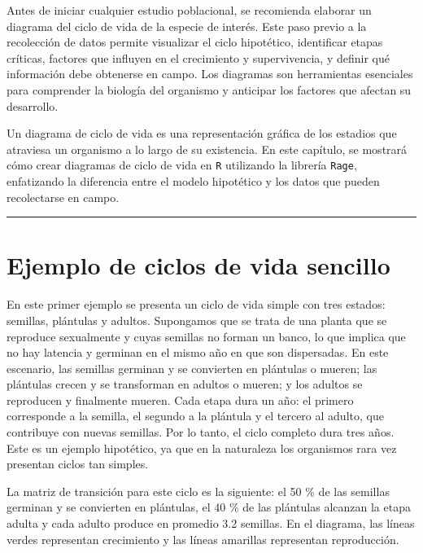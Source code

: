 \documentclass[
  12pt,
  letterpaper,
]{book}
\begin{document}
Antes de iniciar cualquier estudio poblacional, se recomienda elaborar
un diagrama del ciclo de vida de la especie de interés. Este paso previo
a la recolección de datos permite visualizar el ciclo hipotético,
identificar etapas críticas, factores que influyen en el crecimiento y
supervivencia, y definir qué información debe obtenerse en campo. Los
diagramas son herramientas esenciales para comprender la biología del
organismo y anticipar los factores que afectan su desarrollo.

Un diagrama de ciclo de vida es una representación gráfica de los
estadios que atraviesa un organismo a lo largo de su existencia. En este
capítulo, se mostrará cómo crear diagramas de ciclo de vida en
\texttt{R} utilizando la librería \texttt{Rage}, enfatizando la
diferencia entre el modelo hipotético y los datos que pueden
recolectarse en campo.

\begin{center}\rule{0.5\linewidth}{0.5pt}\end{center}

\section{Ejemplo de ciclos de vida
sencillo}\label{ejemplo-de-ciclos-de-vida-sencillo}

En este primer ejemplo se presenta un ciclo de vida simple con tres
estados: semillas, plántulas y adultos. Supongamos que se trata de una
planta que se reproduce sexualmente y cuyas semillas no forman un banco,
lo que implica que no hay latencia y germinan en el mismo año en que son
dispersadas. En este escenario, las semillas germinan y se convierten en
plántulas o mueren; las plántulas crecen y se transforman en adultos o
mueren; y los adultos se reproducen y finalmente mueren. Cada etapa dura
un año: el primero corresponde a la semilla, el segundo a la plántula y
el tercero al adulto, que contribuye con nuevas semillas. Por lo tanto,
el ciclo completo dura tres años. Este es un ejemplo hipotético, ya que
en la naturaleza los organismos rara vez presentan ciclos tan simples.

La matriz de transición para este ciclo es la siguiente: el 50 \% de las
semillas germinan y se convierten en plántulas, el 40 \% de las
plántulas alcanzan la etapa adulta y cada adulto produce en promedio 3.2
semillas. En el diagrama, las líneas verdes representan crecimiento y
las líneas amarillas representan reproducción.
\end{document}
